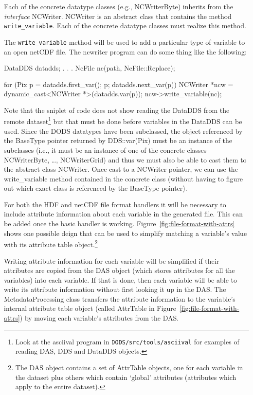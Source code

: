 \documentclass{article}
\begin{document}
Each of the concrete datatype classes (e.g., NCWriterByte) inherits from the
\emph{interface} NCWriter. NCWriter is an abstract class that contains the
method \texttt{write\_variable}. Each of the concrete datatype classes must
realize this method. 

The \texttt{write\_variable} method will be used to add a particular type of
variable to an open netCDF file. The ncwriter program can do some thing like
the following:

\begin{vcode}

DataDDS datadds;
.
.
.
NcFile nc(path, NcFile::Replace);

for (Pix p = datadds.first_var(); p; datadds.next_var(p)) {
    NCWriter *ncw = dynamic_cast<NCWriter *>(datadds.var(p));
    ncw->write_variable(nc);
}

\end{vcode}

Note that the sniplet of code does not show reading the DataDDS from the
remote dataset\footnote{Look at the asciival program in
  \texttt{DODS/src/tools/asciival} for examples of reading DAS, DDS and
  DataDDS objects.} but that must be done before variables in the DataDDS can
be used. Since the DODS datatypes have been subclassed, the object referenced
by the BaseType pointer returned by DDS::var(Pix) must be an instance of the
subclasses (i.e., it must be an instance of one of the concrete classes
NCWriterByte, \ldots, NCWriterGrid) and thus we must also be able to cast
them to the abstract class NCWriter. Once cast to a NCWriter pointer, we can
use the write\_variable method contained in the concrete class (without
having to figure out which exact class is referenced by the BaseType
pointer).

For both the HDF and netCDF file format handlers it will be necessary to
include attribute information about each variable in the generated file. This
can be added once the basic handler is working.
Figure~\ref{fig:file-format-with-attrs} shows one possible deign that can be
used to simplify matching a variable's value with its attribute table
object.\footnote{The DAS object contains a set of AttrTable objects, one for
  each variable in the dataset plus others which contain `global' attributes
  (attributes which apply to the entire dataset).}

Writing attribute information for each variable will be simplified if their
attributes are copied from the DAS object (which stores attributes for all
the variables) into each variable. If that is done, then each variable will
be able to write its attribute information without first looking it up in the
DAS.  The MetadataProcessing class transfers the attribute information to the
variable's internal attribute table object (called AttrTable in
Figure~\ref{fig:file-format-with-attrs}) by moving each variable's attributes
from the DAS.
\end{document}
